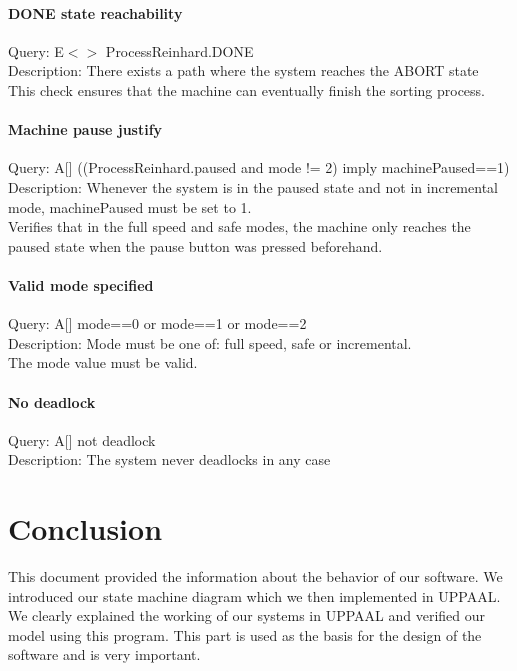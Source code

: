 \documentclass[a4paper,oneside,11pt]{article}
\begin{document}
\paragraph{DONE state reachability}
Query: E$<>$ ProcessReinhard.DONE \\
Description: There exists a path where the system reaches the ABORT state \\
This check ensures that the machine can eventually finish the sorting process.

\paragraph{Machine pause justify}
Query: A[] ((ProcessReinhard.paused and mode != 2) imply machinePaused==1) \\
Description: Whenever the system is in the paused state and not in incremental mode, machinePaused must be set to 1. \\
Verifies that in the full speed and safe modes, the machine only reaches the paused state when the pause button was pressed beforehand.

\paragraph{Valid mode specified}
Query: A[] mode==0 or mode==1 or mode==2 \\
Description: Mode must be one of: full speed, safe or incremental. \\
The mode value must be valid.

\paragraph{No deadlock}
Query: A[] not deadlock \\
Description: The system never deadlocks in any case \\

\section{Conclusion}
This document provided the information about the behavior of our software. We introduced our state machine diagram which we then implemented in UPPAAL. We clearly explained the working of our systems in UPPAAL and verified our model using this program. This part is used as the basis for the design of the software and is very important.
\end{document}
